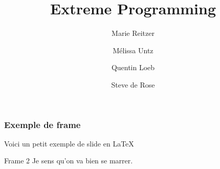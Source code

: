 \documentclass{beamer}
\title{Extreme Programming}
\author{Marie Reitzer \and Mélissa Untz \and Quentin Loeb \and Steve de Rose}
\date{}
\begin{document}
	\maketitle
	
	\begin{frame}
		\frametitle{Exemple de frame}
		Voici un petit exemple de slide en LaTeX
	\end{frame}

	\begin{frame}{Frame 2}
		Je sens qu'on va bien se marrer.
	\end{frame}
	
\end{document}
